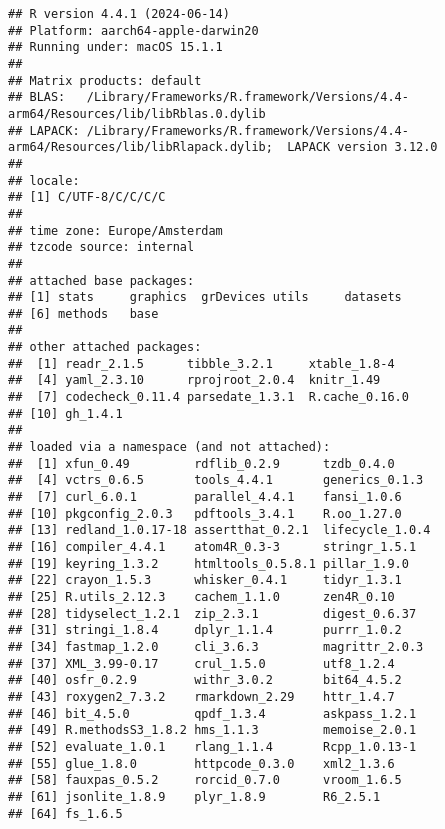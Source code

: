 \documentclass[
]{article}
\begin{document}
\begin{verbatim}
## R version 4.4.1 (2024-06-14)
## Platform: aarch64-apple-darwin20
## Running under: macOS 15.1.1
## 
## Matrix products: default
## BLAS:   /Library/Frameworks/R.framework/Versions/4.4-arm64/Resources/lib/libRblas.0.dylib 
## LAPACK: /Library/Frameworks/R.framework/Versions/4.4-arm64/Resources/lib/libRlapack.dylib;  LAPACK version 3.12.0
## 
## locale:
## [1] C/UTF-8/C/C/C/C
## 
## time zone: Europe/Amsterdam
## tzcode source: internal
## 
## attached base packages:
## [1] stats     graphics  grDevices utils     datasets 
## [6] methods   base     
## 
## other attached packages:
##  [1] readr_2.1.5      tibble_3.2.1     xtable_1.8-4    
##  [4] yaml_2.3.10      rprojroot_2.0.4  knitr_1.49      
##  [7] codecheck_0.11.4 parsedate_1.3.1  R.cache_0.16.0  
## [10] gh_1.4.1        
## 
## loaded via a namespace (and not attached):
##  [1] xfun_0.49         rdflib_0.2.9      tzdb_0.4.0       
##  [4] vctrs_0.6.5       tools_4.4.1       generics_0.1.3   
##  [7] curl_6.0.1        parallel_4.4.1    fansi_1.0.6      
## [10] pkgconfig_2.0.3   pdftools_3.4.1    R.oo_1.27.0      
## [13] redland_1.0.17-18 assertthat_0.2.1  lifecycle_1.0.4  
## [16] compiler_4.4.1    atom4R_0.3-3      stringr_1.5.1    
## [19] keyring_1.3.2     htmltools_0.5.8.1 pillar_1.9.0     
## [22] crayon_1.5.3      whisker_0.4.1     tidyr_1.3.1      
## [25] R.utils_2.12.3    cachem_1.1.0      zen4R_0.10       
## [28] tidyselect_1.2.1  zip_2.3.1         digest_0.6.37    
## [31] stringi_1.8.4     dplyr_1.1.4       purrr_1.0.2      
## [34] fastmap_1.2.0     cli_3.6.3         magrittr_2.0.3   
## [37] XML_3.99-0.17     crul_1.5.0        utf8_1.2.4       
## [40] osfr_0.2.9        withr_3.0.2       bit64_4.5.2      
## [43] roxygen2_7.3.2    rmarkdown_2.29    httr_1.4.7       
## [46] bit_4.5.0         qpdf_1.3.4        askpass_1.2.1    
## [49] R.methodsS3_1.8.2 hms_1.1.3         memoise_2.0.1    
## [52] evaluate_1.0.1    rlang_1.1.4       Rcpp_1.0.13-1    
## [55] glue_1.8.0        httpcode_0.3.0    xml2_1.3.6       
## [58] fauxpas_0.5.2     rorcid_0.7.0      vroom_1.6.5      
## [61] jsonlite_1.8.9    plyr_1.8.9        R6_2.5.1         
## [64] fs_1.6.5
\end{verbatim}
\end{document}
